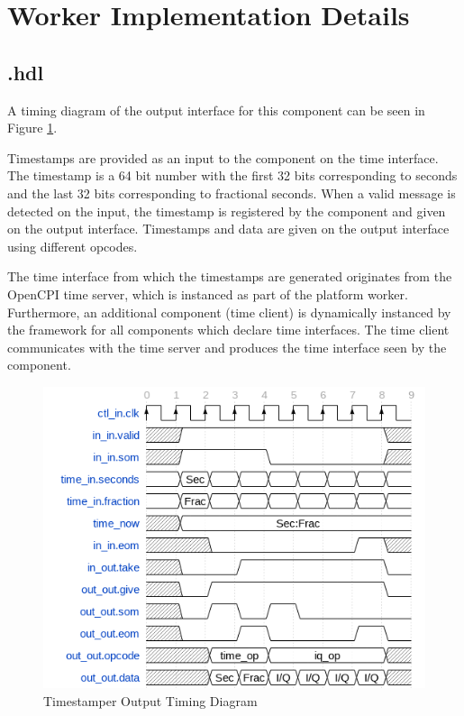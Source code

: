 \section*{Worker Implementation Details}
\subsection*{\comp.hdl}
\begin{flushleft}
	A timing diagram of the output interface for this component can be seen in Figure \ref{fig:timestamper_timing_diagram}.\par\bigskip
	\noindent Timestamps are provided as an input to the component on the time interface. The timestamp is a 64 bit number with the first 32 bits corresponding to seconds and the last 32 bits corresponding to fractional seconds. When a valid message is detected on the input, the timestamp is registered by the component and given on the output interface. Timestamps and data are given on the output interface using different opcodes.\par\bigskip
	The time interface from which the timestamps are generated originates from the OpenCPI time server, which is instanced as part of the platform worker. Furthermore, an additional component (time client) is dynamically instanced by the framework for all components which declare time interfaces. The time client communicates with the time server and produces the time interface seen by the component.
\end{flushleft}
\begin{figure}[h]
	\centering
	\includegraphics[scale=0.6]{timestamper_timing_diagram}
	\caption{Timestamper Output Timing Diagram}
	\label{fig:timestamper_timing_diagram}
\end{figure}

